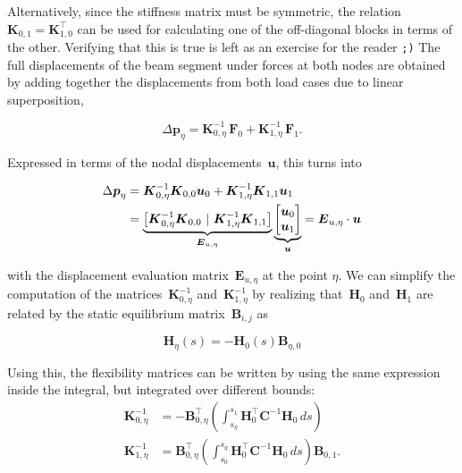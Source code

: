 Alternatively, since the stiffness matrix must be symmetric, the relation~$\boldsymbol{K}_{0,1} = \boldsymbol{K}_{1,0}^\intercal$ can be used for calculating one of the off-diagonal blocks in terms of the other.
Verifying that this is true is left as an exercise for the reader \texttt{;)}
The full displacements of the beam segment under forces at both nodes are obtained by adding together the displacements from both load cases due to linear superposition,

\begin{equation}
\Delta\boldsymbol{p}_{\eta} = \boldsymbol{K}_{0,\eta}^{-1}\,\boldsymbol{F}_0 + \boldsymbol{K}_{1,\eta}^{-1}\,\boldsymbol{F}_1.
\end{equation}

Expressed in terms of the nodal displacements~$\boldsymbol{u}$, this turns into

\begin{align}
\Delta\boldsymbol{p}_{\eta} &= \boldsymbol{K}_{0,\eta}^{-1}\boldsymbol{K}_{0,0}\boldsymbol{u}_0 + \boldsymbol{K}_{1,\eta}^{-1}\boldsymbol{K}_{1,1}\boldsymbol{u}_1 \notag \\
&=
\underbrace{
\left[\boldsymbol{K}_{0,\eta}^{-1}\boldsymbol{K}_{0,0} \ \vert\ \boldsymbol{K}_{1,\eta}^{-1}\boldsymbol{K}_{1,1}\right]
}_{\boldsymbol{E}_{u,\eta}}
\underbrace{
\begin{bmatrix}
\boldsymbol{u}_0 \\
\boldsymbol{u}_1
\end{bmatrix}
}_{\boldsymbol{u}} = \boldsymbol{E}_{u,\eta}\cdot\boldsymbol{u}\label{eq:beam-segment-displacement-eval}
\end{align}

with the displacement evaluation matrix~$\boldsymbol{E}_{u,\eta}$ at the point $\eta$.
We can simplify the computation of the matrices~$\boldsymbol{K}_{0,\eta}^{-1}$ and~$\boldsymbol{K}^{-1}_{1,\eta}$ by realizing that~$\boldsymbol{H}_0$ and~$\boldsymbol{H}_1$ are related by the static equilibrium matrix~$\boldsymbol{B}_{i,j}$ as

\begin{equation}
\boldsymbol{H}_\eta(s) = -\boldsymbol{H}_0(s)\boldsymbol{B}_{\eta,0}
\end{equation}

Using this, the flexibility matrices can be written by using the same expression inside the integral, but integrated over different bounds:
%
\begin{align}
\boldsymbol{K}_{0,\eta}^{-1} &= -\boldsymbol{B}_{0,\eta}^\intercal\left(\int_{s_\eta}^{s_1} \boldsymbol{H}_0^\intercal\boldsymbol{C}^{-1}\boldsymbol{H}_0\,ds\right) \\
\boldsymbol{K}^{-1}_{1,\eta} &= \boldsymbol{B}_{0,\eta}^\intercal\left(\int_{s_0}^{s_\eta} \boldsymbol{H}_0^\intercal\boldsymbol{C}^{-1}\boldsymbol{H}_0\,ds\right)\boldsymbol{B}_{0,1}.
\end{align}

